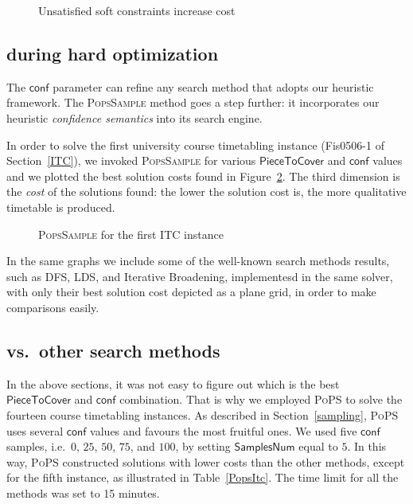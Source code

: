\documentclass{ws-ijait}
\begin{document}
\begin{figure}
  \centering
  
  \caption{Unsatisfied soft constraints increase
           cost\label{CELAR}}
\end{figure}

\subsection{\PopsSample{} during hard optimization}

The $\mathsf{conf}$ parameter can refine any search method
that adopts our heuristic framework. The \textsc{PopsSample}
method goes a step further: it incorporates our heuristic
\emph{confidence semantics} into its search engine.

In order to solve the first university course timetabling
instance (\textsf{Fis0506-1} of Section~\ref{ITC}), we
invoked \textsc{PopsSample} for various
$\mathsf{PieceToCover}$ and $\mathsf{conf}$ values and we
plotted the best solution costs found in Figure~\ref{ITC1}.
The third dimension is the \emph{cost} of the solutions
found: the lower the solution cost is, the more qualitative
timetable is produced.

\begin{figure}
  \centering
  
  \caption{{\normalfont\textsc{PopsSample}} for the first
           ITC instance\label{ITC1}}
\end{figure}

In the same graphs we include some of the well-known search
methods results, such as DFS, LDS, and Iterative Broadening,
implementesd in the same solver, with only their best
solution cost depicted as a plane grid, in order to make
comparisons easily.

\subsection{\PoPS{} vs.\ other search methods}

In the above sections, it was not easy to figure out which
is the best $\mathsf{PieceToCover}$ and $\mathsf{conf}$
combination. That is why we employed \textsc{PoPS} to solve
the fourteen course timetabling instances. As described in
Section~\ref{sampling}, \textsc{PoPS} uses several
$\mathsf{conf}$ values and favours the most fruitful ones.
We used five $\mathsf{conf}$ samples, i.e.\ $0$, $25$, $50$,
$75$, and $100$, by setting $\mathsf{SamplesNum}$ equal to
$5$. In this way, \textsc{PoPS} constructed solutions with
lower costs than the other methods, except for the fifth
instance, as illustrated in Table~\ref{PopsItc}. The time
limit for all the methods was set to 15 minutes.
\end{document}
